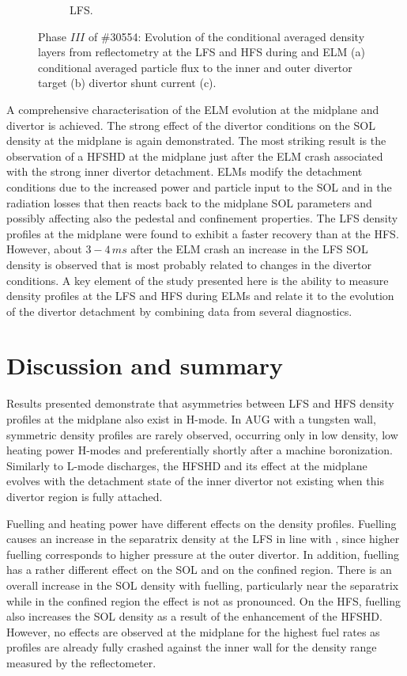 \documentclass[12pt]{iopart}
\begin{document}
\begin{figure}[!hbt]
\begin{subfigure}{3in}
    \label{fig:elm_30554_LFS_III}
	\caption{LFS.}
	\end{subfigure}
	\caption{Phase $III$ of \#30554: Evolution of the conditional averaged density layers from reflectometry at the LFS and HFS during and ELM (a) conditional averaged particle flux to the inner and outer divertor target (b) divertor shunt current (c).}
	\label{fig:elm_30554_III}
\end{figure}

A comprehensive characterisation of the ELM evolution at the midplane and divertor is achieved. The strong effect of the divertor conditions on the SOL density at the midplane is again demonstrated. The most striking result is the observation of a HFSHD at the midplane just after the ELM crash associated with the strong inner divertor detachment. ELMs modify the detachment conditions due to the increased power and particle input to the SOL and in the radiation losses that then reacts back to the midplane SOL parameters and possibly affecting also the pedestal and confinement properties. The LFS density profiles at the midplane were found to exhibit a faster recovery than at the HFS. However, about $3-4\,ms$ after the ELM crash an increase in the LFS SOL density is observed that is most probably related to changes in the divertor conditions. A key element of the study presented here is the ability to measure density profiles at the LFS and HFS during ELMs and relate it to the evolution of the divertor detachment by combining data from several diagnostics.

\section{Discussion and summary}
\label{section:hmodediscussion}

Results presented demonstrate that asymmetries between LFS and HFS density profiles at the midplane also exist in H-mode. In AUG with a tungsten wall, symmetric density profiles are rarely observed, occurring only in low density, low heating power H-modes and preferentially shortly after a machine boronization. Similarly to L-mode discharges, the HFSHD and its effect at the midplane evolves with the detachment state of the inner divertor not existing when this divertor region is fully attached.

Fuelling and heating power have different effects on the density profiles. Fuelling causes an increase in the separatrix density at the LFS in line with \cite{kallenbach2018parameter}, since higher fuelling corresponds to higher pressure at the outer divertor. In addition, fuelling has a rather different effect on the SOL and on the confined region. There is an overall increase in the SOL density with fuelling, particularly near the separatrix while in the confined region the effect is not as pronounced. On the HFS, fuelling also increases the SOL density as a result of the enhancement of the HFSHD. However, no effects are observed at the midplane for the highest fuel rates as profiles are already fully crashed against the inner wall for the density range measured by the reflectometer.
\end{document}
